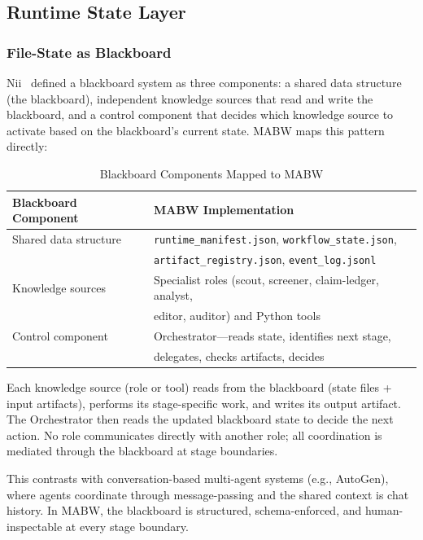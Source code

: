\documentclass[11pt,a4paper]{article}
\begin{document}
\subsection{Runtime State Layer}

\subsubsection{File-State as Blackboard}

Nii~\cite{nii1986} defined a blackboard system as three components: a shared data structure (the blackboard), independent knowledge sources that read and write the blackboard, and a control component that decides which knowledge source to activate based on the blackboard's current state. MABW maps this pattern directly:

\begin{table}[ht]
\centering
\caption{Blackboard Components Mapped to MABW}
\label{tab:blackboard}
\begin{tabular}{@{}ll@{}}
\toprule
\textbf{Blackboard Component} & \textbf{MABW Implementation} \\
\midrule
Shared data structure & \texttt{runtime\_manifest.json}, \texttt{workflow\_state.json}, \\
                      & \texttt{artifact\_registry.json}, \texttt{event\_log.jsonl} \\
Knowledge sources     & Specialist roles (scout, screener, claim-ledger, analyst,\\
                      & \hspace{4pt} editor, auditor) and Python tools \\
Control component     & Orchestrator---reads state, identifies next stage,\\
                      & \hspace{4pt} delegates, checks artifacts, decides \\
\bottomrule
\end{tabular}
\end{table}

Each knowledge source (role or tool) reads from the blackboard (state files + input artifacts), performs its stage-specific work, and writes its output artifact. The Orchestrator then reads the updated blackboard state to decide the next action. No role communicates directly with another role; all coordination is mediated through the blackboard at stage boundaries.

This contrasts with conversation-based multi-agent systems (e.g., AutoGen), where agents coordinate through message-passing and the shared context is chat history. In MABW, the blackboard is structured, schema-enforced, and human-inspectable at every stage boundary.
\end{document}
